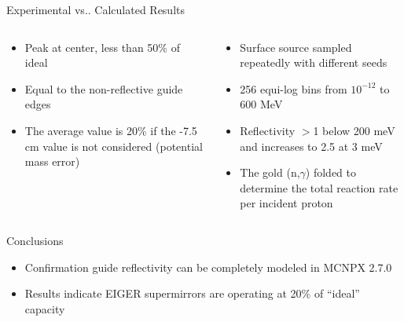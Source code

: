 \documentclass[final,t]{beamer}
\makeatletter
\DeclareRobustCommand\onedot{\futurelet\@let@token\@onedot}
\def\@onedot{\ifx\@let@token.\else.\null\fi\xspace}
\def\vs{{vs}\onedot}
\makeatother
\begin{document}
\begin{frame}{}
\begin{columns}[t]
\begin{column}{.3\linewidth}
\begin{block}{Experimental \vs Calculated Results}
\begin{columns}
      \end{columns}




      \begin{columns}

      \begin{column}{0.5\linewidth}

     
      \begin{itemize}
      \item Peak at center, less than 50\% of ideal
      \item Equal to the non-reflective guide edges
      \item The average value is 20\% if the -7.5 cm value is not considered (potential mass error)
      \end{itemize}


      \end{column}

      \begin{column}{0.5\linewidth}

      \begin{itemize}
      \item Surface source sampled repeatedly with different seeds  
      \item 256 equi-log bins from $10^{-12}$ to 600 MeV
      \item Reflectivity $>$1 below 200 meV and increases to 2.5 at 3 meV
      \item The gold (n,$\gamma$) folded to determine the total reaction rate per incident proton
      \end{itemize}


      \end{column}

      \end{columns}
      
      

      \end{block}


      \vspace{5ex}

      \begin{block}{\alert{Conclusions}}
        \begin{itemize}
        \item Confirmation guide reflectivity can be completely modeled in MCNPX 2.7.0
        \item Results indicate EIGER supermirrors are operating at 20\% of ``ideal'' capacity 
        \end{itemize}
        \vspace{-1ex}
      \end{block}


\end{column}
\end{columns}
\end{frame}
\end{document}
